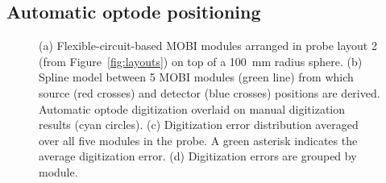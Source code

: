 \subsection{Automatic optode positioning}
\begin{figure}
	\begin{center}
	\end{center}
	\caption{(a) Flexible-circuit-based MOBI modules arranged in probe layout 2 (from Figure~\ref{fig:layouts}) on top of a 100~mm radius sphere. (b) Spline model between 5 MOBI modules (green line) from which source (red crosses) and detector (blue crosses) positions are derived. Automatic optode digitization overlaid on manual digitization results (cyan circles). (c) Digitization error distribution averaged over all five modules in the probe. A green asterisk indicates the average digitization error. (d) Digitization errors are grouped by module.} 
	\label{fig:digitization}
\end{figure} 
